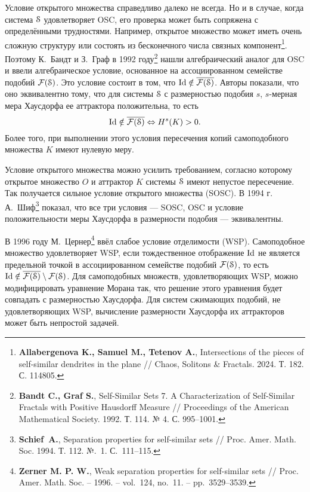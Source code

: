 \documentclass[a5paper,9pt,twoside]{extarticle} %
\begin{document}
Условие открытого множества справедливо далеко не всегда. Но и в случае, когда система ${\EuScript S}$ удовлетворяет OSC, его проверка может быть сопряжена с определёнными трудностями.
Например, открытое множество может иметь очень сложную структуру или состоять из бесконечного числа связных компонент\footnote{{\bf Allabergenova K., Samuel M., Tetenov A.}, Intersections of the pieces of self-similar dendrites in the plane // Chaos, Solitons \& Fractals. 2024. Т. 182. С. 114805.}.
Поэтому К.~Бандт и З.~Граф в 1992 году\footnote{{\bf Bandt C., Graf S.}, Self-Similar Sets 7. A Characterization of Self-Similar Fractals with Positive Hausdorff Measure // Proceedings of the American Mathematical Society. 1992. Т. 114. № 4. С. 995--1001.} нашли алгебраический аналог для OSC и ввели алгебраическое условие, основанное на ассоциированном семействе подобий $\mathcal{F}({\EuScript S})$. 
Это условие состоит в том, что $\mathop{\rm Id} \nolimits\notin\overline{\mathcal{F}({\EuScript S})}$. Авторы показали, что оно эквивалентно тому, что для  системы ${\EuScript S}$ с размерностью подобия $s$, $s$-мерная мера Хаусдорфа  ее аттрактора положительна, то есть
$$\mathop{\rm Id} \nolimits\notin\overline{\mathcal{F}({\EuScript S})} \Leftrightarrow H^s(K)>0.$$
Более того, при выполнении этого условия пересечения копий самоподобного множества $K$ имеют нулевую меру.

Условие открытого множества можно усилить требованием, согласно которому открытое множество $O$ и аттрактор $K$ системы ${\EuScript S}$ имеют непустое пересечение. 
Так получается сильное условие открытого множества (SOSC).
В 1994 г. А.~Шиф\footnote{{\bf Schief~A.}, Separation properties for self-similar sets // Proc. Amer. Math. Soc. 1994. Т. 112. №.~1. С.~111--115.} показал, что все три условия --- SOSC, OSC и условие положительности меры Хаусдорфа в размерности подобия --- эквивалентны.

В 1996 году М.~Цернер\footnote{{\bf Zerner M. P. W.}, Weak separation properties for self-similar sets // Proc. Amer. Math. Soc.  -- 1996. -- vol.~124, no.~11. -- pp.~3529--3539.} ввёл слабое условие отделимости (WSP).
Самоподобное множество удовлетворяет WSP, если тождественное отображение $\mathop{\rm Id} \nolimits$ не является предельной точкой в ассоциированном семействе подобий $\mathcal{F}({\EuScript S})$, то есть $\mathop{\rm Id} \nolimits\notin\overline{\mathcal{F}({\EuScript S})}\setminus\mathcal{F}({\EuScript S})$.
Для самоподобных множеств, удовлетворяющих WSP, можно модифицировать уравнение Морана так, что решение этого уравнения будет совпадать с размерностью Хаусдорфа.
Для систем сжимающих подобий, не удовлетворяющих WSP, вычисление размерности Хаусдорфа их аттракторов может быть  непростой задачей.
\end{document}

